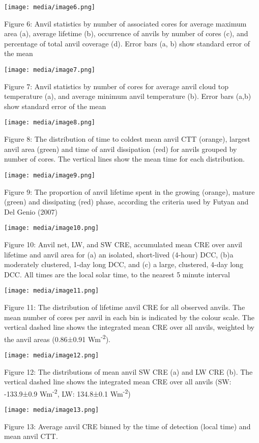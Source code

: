 \texttt{[image: media/image6.png]}

Figure 6: Anvil statistics by number of associated cores for average
maximum area (a), average lifetime (b), occurrence of anvils by number
of cores (c), and percentage of total anvil coverage (d). Error bars (a,
b) show standard error of the mean

\texttt{[image: media/image7.png]}

Figure 7: Anvil statistics by number of cores for average anvil cloud
top temperature (a), and average minimum anvil temperature (b). Error
bars (a,b) show standard error of the mean

\texttt{[image: media/image8.png]}

Figure 8: The distribution of time to coldest mean anvil CTT (orange),
largest anvil area (green) and time of anvil dissipation (red) for
anvils grouped by number of cores. The vertical lines show the mean time
for each distribution.

\texttt{[image: media/image9.png]}

Figure 9: The proportion of anvil lifetime spent in the growing
(orange), mature (green) and dissipating (red) phase, according the
criteria used by Futyan and Del Genio (2007)

\texttt{[image: media/image10.png]}

Figure 10: Anvil net, LW, and SW CRE, accumulated mean CRE over anvil
lifetime and anvil area for (a) an isolated, short-lived (4-hour) DCC,
(b)a moderately clustered, 1-day long DCC, and (c) a large, clustered,
4-day long DCC. All times are the local solar time, to the nearest 5
minute interval

\texttt{[image: media/image11.png]}

Figure 11: The distribution of lifetime anvil CRE for all observed
anvils. The mean number of cores per anvil in each bin is indicated by
the colour scale. The vertical dashed line shows the integrated mean CRE
over all anvils, weighted by the anvil areas (0.86±0.91
Wm\textsuperscript{-2}).

\texttt{[image: media/image12.png]}

Figure 12: The distributions of mean anvil SW CRE (a) and LW CRE (b).
The vertical dashed line shows the integrated mean CRE over all anvils
(SW: -133.9±0.9 Wm\textsuperscript{-2}, LW: 134.8±0.1
Wm\textsuperscript{-2})

\texttt{[image: media/image13.png]}

Figure 13: Average anvil CRE binned by the time of detection (local
time) and mean anvil CTT.


